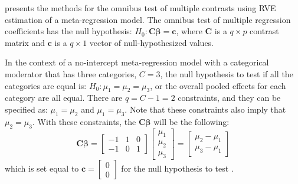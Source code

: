 \textcite{tipton2015b} presents the methods for the omnibus test of multiple contrasts using RVE estimation of a meta-regression model. The omnibus test of multiple regression coefficients has the null hypothesis:
$H_0: \mathbf{C}\bm{\beta} = \mathbf{c}$, where $\mathbf{C}$ is a $q \times p$ contrast matrix and $\mathbf{c}$ is a $q \times 1$ vector of null-hypothesized values. 


In the context of a no-intercept meta-regression model with a categorical moderator that has three categories, $ C=3$, the null hypothesis to test if all the categories are equal is: $H_0: \mu_1 = \mu_2 = \mu_3$, or the overall pooled effects for each category are all equal. There are $q = C-1 = 2$ constraints, and they can be specified as: $\mu_1 = \mu_2$ and $\mu_1 = \mu_3$. Note that these constraints also imply that $\mu_2 = \mu_3$. With these constraints, the $\mathbf{C}\bm{\beta}$ will be the following:
\begin{equation}
\mathbf{C}\bm{\beta} =
    \begin{bmatrix}
        -1 & 1 & 0 \\
        -1 & 0 & 1
    \end{bmatrix} \begin{bmatrix}
        \mu_1 \\
        \mu_2 \\
        \mu_3
    \end{bmatrix} =
    \begin{bmatrix}
        \mu_2 - \mu_1 \\
        \mu_3 - \mu_1
    \end{bmatrix}
\end{equation}
which is set equal to $\mathbf{c} = \begin{bmatrix}
    0 \\ 0
\end{bmatrix}$ for the null hypothesis to test \autocite{pustejovsky_wald_2025}.

